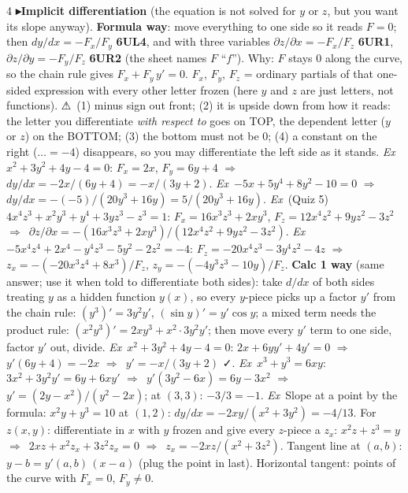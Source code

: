 \documentclass{article}
\newcommand\sh[1]{{\setlength\fboxsep{0.18pt}\colorbox{black!22}{\textbf{#1}}}}  %
\newcommand\pt[1]{\textbf{{\symf ▸}#1}}       %
\newcommand\ex{\textit{Ex}\ }                  %
\newcommand\warn{{\symf ⚠}}                    %
\newcommand\ok{{\symf ✓}}                       %
\newcommand\then{\ensuremath{\Rightarrow}}
\newcommand\pd{\partial}
\begin{document}
\begin{multicols*}{4}
\pt{Implicit differentiation} (the equation is not solved for $y$ or $z$, but you want its slope anyway). \textbf{Formula way}: move everything to one side so it reads $F=0$; then $dy/dx=-F_x/F_y$ \sh{6UL4}, and with three variables $\pd z/\pd x=-F_x/F_z$ \sh{6UR1}, $\pd z/\pd y=-F_y/F_z$ \sh{6UR2} (the sheet names $F$ ``$f$''). Why: $F$ stays 0 along the curve, so the chain rule gives $F_x+F_y\,y'=0$. $F_x$, $F_y$, $F_z$ = ordinary partials of that one-sided expression with every other letter frozen (here $y$ and $z$ are just letters, not functions). \warn\ (1) minus sign out front; (2) it is upside down from how it reads: the letter you differentiate \textit{with respect to} goes on TOP, the dependent letter ($y$ or $z$) on the BOTTOM; (3) the bottom must not be 0; (4) a constant on the right ($\dots=-4$) disappears, so you may differentiate the left side as it stands. \ex $x^2+3y^2+4y-4=0$: $F_x=2x$, $F_y=6y+4$ \then\ $dy/dx=-2x/(6y+4)=-x/(3y+2)$. \ex $-5x+5y^4+8y^2-10=0$ \then\ $dy/dx=-(-5)/(20y^3+16y)=5/(20y^3+16y)$. \ex (Quiz 5) $4x^4z^3+x^2y^3+y^4+3yz^3-z^3=1$: $F_x=16x^3z^3+2xy^3$, $F_z=12x^4z^2+9yz^2-3z^2$ \then\ $\pd z/\pd x=-(16x^3z^3+2xy^3)/(12x^4z^2+9yz^2-3z^2)$. \ex $-5x^4z^4+2x^4-y^4z^3-5y^2-2z^2=-4$: $F_z=-20x^4z^3-3y^4z^2-4z$ \then\ $z_x=-(-20x^3z^4+8x^3)/F_z$, $z_y=-(-4y^3z^3-10y)/F_z$. \textbf{Calc 1 way} (same answer; use it when told to differentiate both sides): take $d/dx$ of both sides treating $y$ as a hidden function $y(x)$, so every $y$-piece picks up a factor $y'$ from the chain rule: $(y^3)'=3y^2y'$, $(\sin y)'=y'\cos y$; a mixed term needs the product rule: $(x^2y^3)'=2xy^3+x^2\cdot3y^2y'$; then move every $y'$ term to one side, factor $y'$ out, divide. \ex $x^2+3y^2+4y-4=0$: $2x+6yy'+4y'=0$ \then\ $y'(6y+4)=-2x$ \then\ $y'=-x/(3y+2)$ \ok. \ex $x^3+y^3=6xy$: $3x^2+3y^2y'=6y+6xy'$ \then\ $y'(3y^2-6x)=6y-3x^2$ \then\ $y'=(2y-x^2)/(y^2-2x)$; at $(3,3)$: $-3/3=-1$. \ex Slope at a point by the formula: $x^2y+y^3=10$ at $(1,2)$: $dy/dx=-2xy/(x^2+3y^2)=-4/13$. For $z(x,y)$: differentiate in $x$ with $y$ frozen and give every $z$-piece a $z_x$: $x^2z+z^3=y$ \then\ $2xz+x^2z_x+3z^2z_x=0$ \then\ $z_x=-2xz/(x^2+3z^2)$. Tangent line at $(a,b)$: $y-b=y'(a,b)\,(x-a)$ (plug the point in last). Horizontal tangent: points of the curve with $F_x=0$, $F_y\ne0$.


\end{multicols*}
\end{document}
